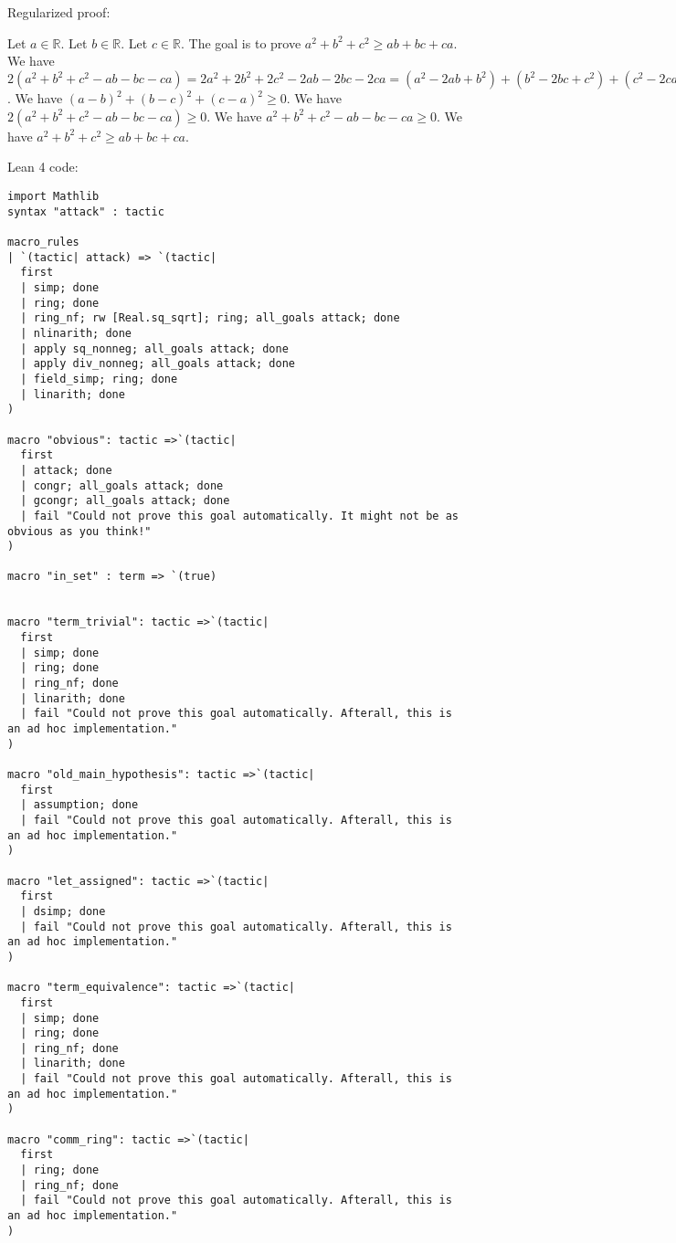 \documentclass{article}
\begin{document}
Regularized proof:
\begin{tcolorbox}[colback=red!10, width=\linewidth]
Let $a\in\mathbb{R}$.
Let $b\in\mathbb{R}$.
Let $c\in\mathbb{R}$.
The goal is to prove $a^2 + b^2 + c^2 \geq ab + bc + ca$.
We have $2(a^2 + b^2 + c^2 - ab - bc - ca) = 2a^2 + 2b^2 + 2c^2 - 2ab - 2bc - 2ca = (a^2 - 2ab + b^2) + (b^2 - 2bc + c^2) + (c^2 - 2ca + a^2) = {(a-b)}^2 + {(b-c)}^2 + {(c-a)}^2$.
We have ${(a-b)}^2 + {(b-c)}^2 + {(c-a)}^2 \ge 0$.
We have $2(a^2 + b^2 + c^2 - ab - bc - ca) \ge 0$.
We have $a^2 + b^2 + c^2 - ab - bc - ca \ge 0$.
We have $a^2 + b^2 + c^2 \geq ab + bc + ca$.
\end{tcolorbox}

Lean 4 code:
\begin{tcolorbox}[colback=white!10, width=\linewidth]
\begin{lstlisting}[language=Lean4]
import Mathlib
syntax "attack" : tactic

macro_rules
| `(tactic| attack) => `(tactic|
  first
  | simp; done
  | ring; done
  | ring_nf; rw [Real.sq_sqrt]; ring; all_goals attack; done
  | nlinarith; done
  | apply sq_nonneg; all_goals attack; done
  | apply div_nonneg; all_goals attack; done
  | field_simp; ring; done
  | linarith; done
)

macro "obvious": tactic =>`(tactic|
  first
  | attack; done
  | congr; all_goals attack; done
  | gcongr; all_goals attack; done
  | fail "Could not prove this goal automatically. It might not be as obvious as you think!"
)

macro "in_set" : term => `(true)


macro "term_trivial": tactic =>`(tactic|
  first
  | simp; done
  | ring; done
  | ring_nf; done
  | linarith; done
  | fail "Could not prove this goal automatically. Afterall, this is an ad hoc implementation."
)

macro "old_main_hypothesis": tactic =>`(tactic|
  first
  | assumption; done
  | fail "Could not prove this goal automatically. Afterall, this is an ad hoc implementation."
)

macro "let_assigned": tactic =>`(tactic|
  first
  | dsimp; done
  | fail "Could not prove this goal automatically. Afterall, this is an ad hoc implementation."
)

macro "term_equivalence": tactic =>`(tactic|
  first
  | simp; done
  | ring; done
  | ring_nf; done
  | linarith; done
  | fail "Could not prove this goal automatically. Afterall, this is an ad hoc implementation."
)

macro "comm_ring": tactic =>`(tactic|
  first
  | ring; done
  | ring_nf; done
  | fail "Could not prove this goal automatically. Afterall, this is an ad hoc implementation."
)


\end{lstlisting}
\end{tcolorbox}
\end{document}
